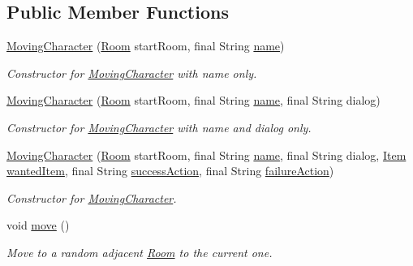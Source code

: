 \subsection*{Public Member Functions}
\begin{DoxyCompactItemize}
\item 
\hyperlink{classpkg__world_1_1pkg__characters_1_1MovingCharacter_aa8e7cc0d5fc072ea1bb2545cda28d7ee}{Moving\-Character} (\hyperlink{classpkg__world_1_1Room}{Room} start\-Room, final String \hyperlink{classpkg__world_1_1pkg__characters_1_1Character_a54831aae75fcaacb68cb500a12ffe457}{name})
\begin{DoxyCompactList}\small\item\em Constructor for \hyperlink{classpkg__world_1_1pkg__characters_1_1MovingCharacter}{Moving\-Character} with name only. \end{DoxyCompactList}\item 
\hyperlink{classpkg__world_1_1pkg__characters_1_1MovingCharacter_a3ff1fb87a50e7370aea5e9da6ef8abe4}{Moving\-Character} (\hyperlink{classpkg__world_1_1Room}{Room} start\-Room, final String \hyperlink{classpkg__world_1_1pkg__characters_1_1Character_a54831aae75fcaacb68cb500a12ffe457}{name}, final String dialog)
\begin{DoxyCompactList}\small\item\em Constructor for \hyperlink{classpkg__world_1_1pkg__characters_1_1MovingCharacter}{Moving\-Character} with name and dialog only. \end{DoxyCompactList}\item 
\hyperlink{classpkg__world_1_1pkg__characters_1_1MovingCharacter_aa1857c9134647d712611944bfd9d793a}{Moving\-Character} (\hyperlink{classpkg__world_1_1Room}{Room} start\-Room, final String \hyperlink{classpkg__world_1_1pkg__characters_1_1Character_a54831aae75fcaacb68cb500a12ffe457}{name}, final String dialog, \hyperlink{classpkg__world_1_1pkg__items_1_1Item}{Item} \hyperlink{classpkg__world_1_1pkg__characters_1_1Character_a3e5abf14759d18446163db9597d10a44}{wanted\-Item}, final String \hyperlink{classpkg__world_1_1pkg__characters_1_1Character_a3f1c0fc80b859a8625f334782b1bb74a}{success\-Action}, final String \hyperlink{classpkg__world_1_1pkg__characters_1_1Character_add959e452ec866785ef0d48f054b13ab}{failure\-Action})
\begin{DoxyCompactList}\small\item\em Constructor for \hyperlink{classpkg__world_1_1pkg__characters_1_1MovingCharacter}{Moving\-Character}. \end{DoxyCompactList}\item 
void \hyperlink{classpkg__world_1_1pkg__characters_1_1MovingCharacter_aaf4df04191a12b44ecf4d5e127c3a969}{move} ()
\begin{DoxyCompactList}\small\item\em Move to a random adjacent \hyperlink{classpkg__world_1_1Room}{Room} to the current one. \end{DoxyCompactList}\end{DoxyCompactItemize}
